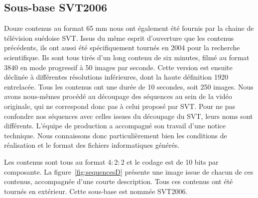 \subsection{Sous-base SVT2006} \label{ssec:seq-svt2006}
Douze contenus au format 65 mm nous ont également été fournis par la chaine de télévision suédoise SVT. Issus du même esprit d'ouverture que les contenus précédents, ils ont aussi été spécifiquement tournés en 2004 pour la recherche scientifique. Ils sont tous tirés d'un long contenu de six minutes, filmé au format 3840 en mode progressif à 50 images par seconde. Cette version est ensuite déclinée à différentes résolutions inférieures, dont la haute définition 1920 entrelacée. Tous les contenus ont une durée de 10 secondes, soit 250 images. Nous avons nous-mêmes procédé au découpage des séquences au sein de la vidéo originale, qui ne correspond donc pas à celui proposé par SVT. Pour ne pas confondre nos séquences avec celles issues du découpage du SVT, leurs noms sont différents. L'équipe de production a accompagné son travail d'une notice technique. Nous connaissons donc particulièrement bien les conditions de réalisation et le format des fichiers informatiques générés.

Les contenus sont tous au format 4$:$2$:$2 et le codage est de 10 bits par composante. La figure~\ref{fig:sequencesD} présente une image issue de chacun de ces contenus, accompagnée d'une courte description. Tous ces contenus ont été tournés en extérieur. Cette sous-base est nommée SVT2006.

